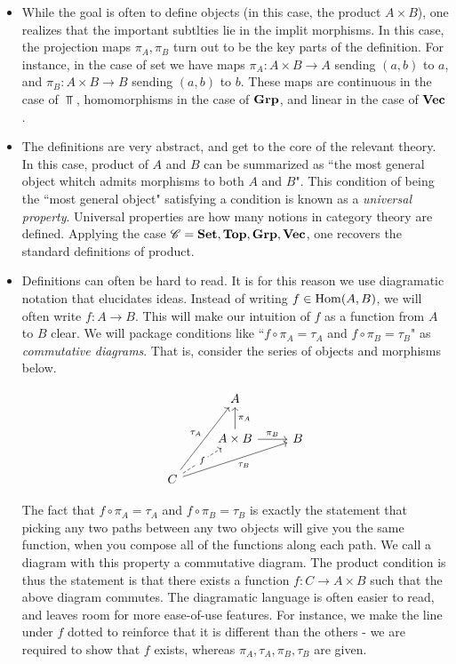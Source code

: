 \documentclass{article}
\theoremstyle{definition}
\numberwithin{figure}{section}
\begin{document}
\begin{itemize}
\item While the goal is often to define objects (in this case, the product $A\times B$), one realizes that the important subtlties lie in the implit morphisms. In this case, the projection maps $\pi_A,\pi_B$ turn out to be the key parts of the definition. For instance, in the case of set we have maps $\pi_A: A\times B\to A$ sending $(a,b)$ to $a$, and $\pi_B: A\times B\to B$ sending $(a,b)$ to $b$. These maps are continuous in the case of $\Top$, homomorphisms in the case of $\bold{Grp}$, and linear in the case of $\bold{Vec}$.

\item The definitions are very abstract, and get to the core of the relevant theory. In this case, product of $A$ and $B$ can be summarized as ``the most general object whitch admits morphisms to both $A$ and $B$". This condition of being the ``most general object" satisfying a condition is known as a \textit{universal property}. Universal properties are how many notions in category theory are defined. Applying the case $\mathscr{C}=\bold{Set},\bold{Top},\bold{Grp},\bold{Vec}$, one recovers the standard definitions of product.

\item Definitions can often be hard to read. It is for this reason we use diagramatic notation that elucidates ideas. Instead of writing $f\in \mathrm{Hom}(A,B)$, we will often write $f:A\to B$. This will make our intuition of $f$ as a function from $A$ to $B$ clear. We will package conditions like ``$f\circ \pi_A=\tau_A$ and $f\circ \pi_B=\tau_B$" as \textit{commutative diagrams}. That is, consider the series of objects and morphisms below.

\[\begin{tikzcd}
	& A \\
	& {A\times B} & B \\
	C
	\arrow["{\pi_A}"', from=2-2, to=1-2]
	\arrow["{\pi_B}", from=2-2, to=2-3]
	\arrow["f"{description}, dashed, from=3-1, to=2-2]
	\arrow["{\tau_A}", from=3-1, to=1-2]
	\arrow["{\tau_B}"', from=3-1, to=2-3]
\end{tikzcd}\]

The fact that $f\circ \pi_A=\tau_A$ and $f\circ \pi_B=\tau_B$ is exactly the statement that picking any two paths between any two objects will give you the same function, when you compose all of the functions along each path. We call a diagram with this property a commutative diagram. The product condition is thus the statement is that there exists a function $f:C\to A\times B$ such that the above diagram commutes. The diagramatic language is often easier to read, and leaves room for more ease-of-use features. For instance, we make the line under $f$ dotted to reinforce that it is different than the others - we are required to show that $f$ exists, whereas $\pi_A,\tau_A,\pi_B,\tau_B$ are given.
\end{itemize}
\end{document}
